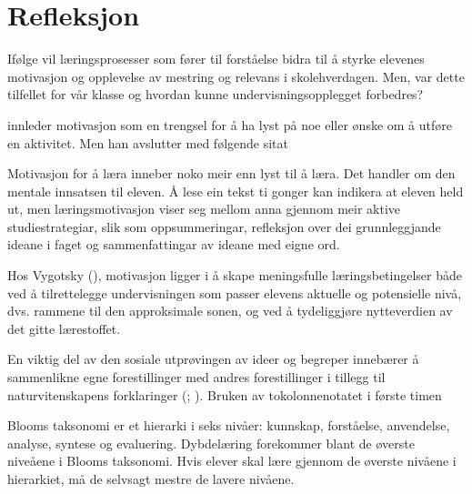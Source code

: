 \documentclass[main.tex]{subfiles}
\begin{document}
\section*{Refleksjon}
\label{sec:3}

Ifølge  vil læringsprosesser som fører til forståelse bidra til å styrke elevenes motivasjon og 
opplevelse av mestring og relevans i skolehverdagen. Men, var dette tilfellet for vår klasse og hvordan
kunne undervisningsopplegget forbedres?

 innleder motivasjon som en trengsel for å ha lyst på noe eller ønske om å utføre en aktivitet.
Men han avslutter med følgende sitat
\begin{displayquote}
Motivasjon for å læra inneber noko meir enn lyst til å læra. Det handler om den mentale innsatsen til eleven.
Å lese ein tekst ti gonger kan indikera at eleven held ut, men læringsmotivasjon viser seg mellom anna gjennom
meir aktive studiestrategiar, slik som oppsummeringar, refleksjon over dei grunnleggjande ideane i faget og 
sammenfattingar av ideane med eigne ord.
\end{displayquote}
Hos Vygotsky (), motivasjon ligger i å skape meningsfulle læringsbetingelser både ved å tilrettelegge 
undervisningen som passer elevens aktuelle og potensielle nivå, dvs. rammene til den approksimale sonen, og ved å tydeliggjøre 
nytteverdien av det gitte lærestoffet. 

En viktig del av den sosiale utprøvingen av ideer og begreper innebærer å sammenlikne egne forestillinger
med andres forestillinger i tillegg til naturvitenskapens forklaringer (; ).
Bruken av tokolonnenotatet i første timen 

Blooms taksonomi er et hierarki i seks nivåer: kunnskap, forståelse, anvendelse, analyse, syntese og evaluering. Dybdelæring forekommer blant de øverste niveåene
i Blooms taksonomi. Hvis elever skal lære gjennom de øverste nivåene i hierarkiet, må de selvsagt mestre de lavere nivåene.
\end{document}
